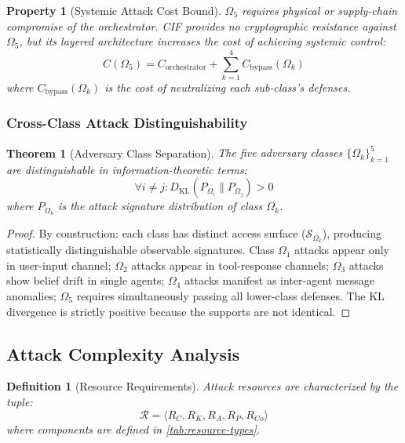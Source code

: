 \documentclass[
]{article}
\newtheorem{definition}{Definition}[section]
\newtheorem{theorem}{Theorem}[section]
\newtheorem{property}{Property}[section]
\begin{document}
\begin{property}[Systemic Attack Cost Bound]
\label{prop:omega5-scope}
$\Omega_5$ requires physical or supply-chain compromise of the orchestrator. CIF provides no cryptographic resistance against $\Omega_5$, but its layered architecture increases the cost of achieving systemic control:
\begin{equation}
\label{eq:omega5-cost}
C(\Omega_5) = C_{\text{orchestrator}} + \sum_{k=1}^{4} C_{\text{bypass}}(\Omega_k)
\end{equation}
where $C_{\text{bypass}}(\Omega_k)$ is the cost of neutralizing each sub-class's defenses.
\end{property}

\subsubsection{Cross-Class Attack
Distinguishability}\label{cross-class-attack-distinguishability}

\begin{theorem}[Adversary Class Separation]
\label{thm:class-separation}
The five adversary classes $\{\Omega_k\}_{k=1}^5$ are distinguishable in information-theoretic terms:
\begin{equation}
\label{eq:class-separation}
\forall i \neq j: D_{\mathrm{KL}}(P_{\Omega_i} \| P_{\Omega_j}) > 0
\end{equation}
where $P_{\Omega_k}$ is the attack signature distribution of class $\Omega_k$.
\end{theorem}

\begin{proof}
By construction: each class has distinct access surface ($\mathcal{S}_{\Omega_k}$), producing statistically distinguishable observable signatures. Class $\Omega_1$ attacks appear only in user-input channel; $\Omega_2$ attacks appear in tool-response channels; $\Omega_3$ attacks show belief drift in single agents; $\Omega_4$ attacks manifest as inter-agent message anomalies; $\Omega_5$ requires simultaneously passing all lower-class defenses. The KL divergence is strictly positive because the supports are not identical.
\end{proof}

\subsection{Attack Complexity Analysis}\label{sec:attack-complexity}

\begin{definition}[Resource Requirements]
\label{def:resources}
Attack resources are characterized by the tuple:
\begin{equation}
\label{eq:resource-tuple}
\mathcal{R} = \langle R_C, R_K, R_A, R_P, R_{Co} \rangle
\end{equation}
where components are defined in \cref{tab:resource-types}.
\end{definition}
\end{document}
